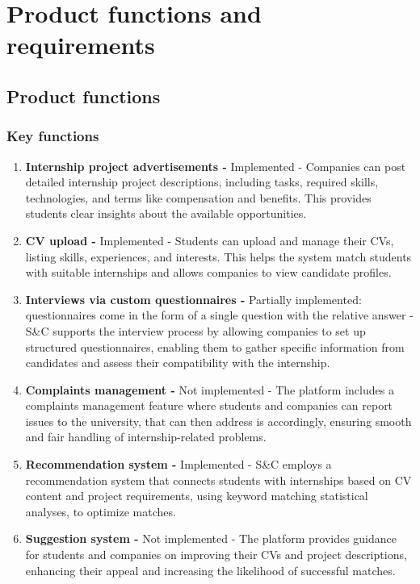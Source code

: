 \chapter{Product functions and requirements}

\section{Product functions}

\subsection{Key functions}

\begin{enumerate}[label=\textbf{KF\arabic* -}]
    \item \textbf{Internship project advertisements -}
    Implemented - Companies can post detailed internship project descriptions, including tasks, required skills, technologies, and terms like compensation and benefits.
    This provides students clear insights about the available opportunities.
    \item \textbf{CV upload -}
    Implemented - Students can upload and manage their CVs, listing skills, experiences, and interests.
    This helps the system match students with suitable internships and allows companies to view candidate profiles.
    \item \textbf{Interviews via custom questionnaires -}
    Partially implemented: questionnaires come in the form of a single question with the relative answer - S\&C supports the interview process by allowing companies to set up structured questionnaires, enabling them to gather specific information from candidates and assess their compatibility with the internship.
    \item \textbf{Complaints management -}
    Not implemented - The platform includes a complaints management feature where students and companies can report issues to the university, that can then address is accordingly, ensuring smooth and fair handling of internship-related problems.
    \item \textbf{Recommendation system -}
    Implemented - S\&C employs a recommendation system that connects students with internships based on CV content and project requirements, using keyword matching statistical analyses, to optimize matches.
    \item \textbf{Suggestion system -}
    Not implemented - The platform provides guidance for students and companies on improving their CVs and project descriptions, enhancing their appeal and increasing the likelihood of successful matches.
\end{enumerate}

